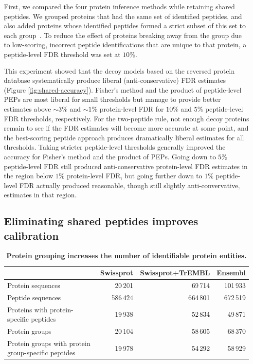 \documentclass{article}
\begin{document}
First, we compared the four protein inference methods while retaining
shared peptides. We grouped proteins that had the same set of
identified peptides, and also added proteins whose identified peptides
formed a strict subset of this set to each
group~\cite{nesvizhskii2005interpretation, serang2012review}.
To reduce the effect of proteins breaking away from the
group due to low-scoring, incorrect peptide identifications that are
unique to that protein, a peptide-level FDR threshold was set at
$10\%$.

This experiment showed that the decoy models based on the reversed
protein database systematically produce liberal (anti-conservative)
FDR estimates (Figure \ref{fig:shared-accuracy}). Fisher's method and
the product of peptide-level PEPs are most liberal for small
thresholds but manage to provide better estimates above $\sim 3\%$ and
$\sim 1\%$ protein-level FDR for $10\%$ and $5\%$ peptide-level FDR
thresholds, respectively. For the two-peptide rule, not enough decoy
proteins remain to see if the FDR estimates will become more accurate
at some point, and the best-scoring peptide approach produces
dramatically liberal estimates for all thresholds. Taking stricter
peptide-level thresholds generally improved the accuracy for Fisher's
method and the product of PEPs. Going down to $5\%$ peptide-level FDR
still produced anti-conservative protein-level FDR estimates in the
region below $1\%$ protein-level FDR, but going further down to $1\%$
peptide-level FDR actually produced reasonable, though still slightly
anti-convervative, estimates in that region.

\subsection*{Eliminating shared peptides improves calibration}

\begin{table}
\caption{\label{tab:duplicate-proteins}\textbf{Protein grouping
    increases the number of identifiable protein entities.}}
\scriptsize
\begin{center}
\begin{tabular}{lrrr}
\hline
& Swissprot & Swissprot+TrEMBL & Ensembl\\
\hline
Protein sequences & 20\,201 & 69\,714 & 101\,933\\
Peptide sequences & 586\,424 & 664\,801 & 672\,519\\
Proteins with protein-specific peptides & 19\,938 & 52\,834 &
49\,871\\
Protein groups & 20\,104 & 58\,605 & 68\,370\\
Protein groups with protein group-specific peptides & 19\,978 &
54\,292 & 58\,929\\
\hline
\end{tabular}
\end{center}
\end{table}
\end{document}
